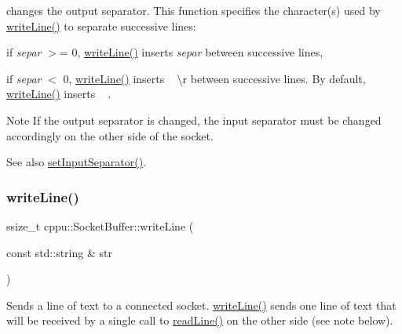 changes the output separator. This function specifies the character(s) used by \mbox{\hyperlink{classcppu_1_1_socket_buffer_a92ae0351aaee8719d34e8c4618495d59}{write\+Line()}} to separate successive lines\+: 


\begin{DoxyItemize}
\item if {\itshape separ} $>$= 0, \mbox{\hyperlink{classcppu_1_1_socket_buffer_a92ae0351aaee8719d34e8c4618495d59}{write\+Line()}} inserts {\itshape separ} between successive lines,
\item if {\itshape separ} $<$ 0, \mbox{\hyperlink{classcppu_1_1_socket_buffer_a92ae0351aaee8719d34e8c4618495d59}{write\+Line()}} inserts ~\newline
\textbackslash{}r between successive lines. By default, \mbox{\hyperlink{classcppu_1_1_socket_buffer_a92ae0351aaee8719d34e8c4618495d59}{write\+Line()}} inserts ~\newline
. \begin{DoxyNote}{Note}
If the output separator is changed, the input separator must be changed accordingly on the other side of the socket. 
\end{DoxyNote}
\begin{DoxySeeAlso}{See also}
\mbox{\hyperlink{classcppu_1_1_socket_buffer_acadf4540c1e3eba67b014753b84b482c}{set\+Input\+Separator()}}. 
\end{DoxySeeAlso}

\end{DoxyItemize}\mbox{\label{classcppu_1_1_socket_buffer_a92ae0351aaee8719d34e8c4618495d59}} 
\subsubsection{\texorpdfstring{writeLine()}{writeLine()}}
{\footnotesize\ttfamily ssize\+\_\+t cppu\+::\+Socket\+Buffer\+::write\+Line (\begin{DoxyParamCaption}\item[{const std\+::string \&}]{str }\end{DoxyParamCaption})\hspace{0.3cm}{\ttfamily [virtual]}}



Sends a line of text to a connected socket. \mbox{\hyperlink{classcppu_1_1_socket_buffer_a92ae0351aaee8719d34e8c4618495d59}{write\+Line()}} sends one line of text that will be received by a single call to \mbox{\hyperlink{classcppu_1_1_socket_buffer_a222769d3776b9cbd3a727ee1f0e60358}{read\+Line()}} on the other side (see note below). 

